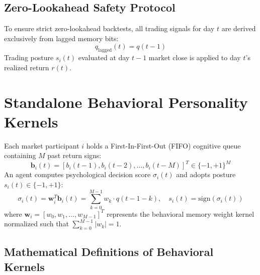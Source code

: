 \documentclass[11pt,a4paper]{article}
\begin{document}
\subsection{Zero-Lookahead Safety Protocol}
To ensure strict zero-lookahead backtests, all trading signals for day $t$ are derived exclusively from lagged memory bits:
\begin{equation}
    q_{\text{lagged}}(t) = q(t - 1)
\end{equation}
Trading posture $s_i(t)$ evaluated at day $t-1$ market close is applied to day $t$'s realized return $r(t)$.

\section{Standalone Behavioral Personality Kernels}

Each market participant $i$ holds a First-In-First-Out (FIFO) cognitive queue containing $M$ past return signs:
\begin{equation}
    \mathbf{b}_i(t) = [b_i(t-1), b_i(t-2), \dots, b_i(t-M)]^T \in \{-1, +1\}^M
\end{equation}
An agent computes psychological decision score $\sigma_i(t)$ and adopts posture $s_i(t) \in \{-1, +1\}$:
\begin{equation}
    \sigma_i(t) = \mathbf{w}_i^T \mathbf{b}_i(t) = \sum_{k=0}^{M-1} w_k \cdot q(t-1-k), \quad s_i(t) = \text{sign}(\sigma_i(t))
\end{equation}
where $\mathbf{w}_i = [w_0, w_1, \dots, w_{M-1}]^T$ represents the behavioral memory weight kernel normalized such that $\sum_{k=0}^{M-1} |w_k| = 1$.

\subsection{Mathematical Definitions of Behavioral Kernels}
\end{document}
